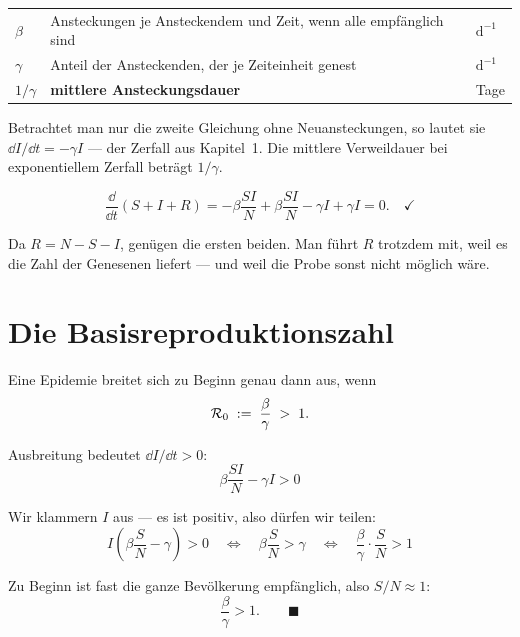 \begin{merksatz}
\begin{center}
\renewcommand{\arraystretch}{1.5}
\begin{tabular}{@{}P{1.4cm}P{3.0cm}P{3.6cm}@{}}
\toprule
$\beta$ & Ansteckungen je Ansteckendem und Zeit, wenn alle empfänglich sind & $\mathrm{d}^{-1}$\\
$\gamma$ & Anteil der Ansteckenden, der je Zeiteinheit genest & $\mathrm{d}^{-1}$\\
$1/\gamma$ & \textbf{mittlere Ansteckungsdauer} & Tage\\
\bottomrule
\end{tabular}
\end{center}

Betrachtet man nur die zweite Gleichung ohne Neuansteckungen, so lautet sie $\dd I/\dd t = -\gamma I$ --- der Zerfall aus Kapitel~1. Die mittlere Verweildauer bei exponentiellem Zerfall beträgt $1/\gamma$.

\[ \frac{\dd}{\dd t}(S+I+R) = -\beta\frac{SI}{N} + \beta\frac{SI}{N} - \gamma I + \gamma I = 0 . \quad \checkmark \]

\begin{center}
\begin{minipage}{0.88\textwidth}
\end{minipage}
\end{center}

Da $R = N - S - I$, genügen die ersten beiden. Man führt $R$ trotzdem mit, weil es die Zahl der Genesenen liefert --- und weil die Probe sonst nicht möglich wäre.
\end{merksatz}

\section{Die Basisreproduktionszahl}

\begin{merksatz}
Eine Epidemie breitet sich zu Beginn genau dann aus, wenn
\[ \mathcal{R}_0 \;:=\; \frac{\beta}{\gamma} \;>\; 1 . \]

Ausbreitung bedeutet $\dd I/\dd t > 0$:
\[ \beta\frac{SI}{N} - \gamma I > 0 \]

Wir klammern $I$ aus --- es ist positiv, also dürfen wir teilen:
\[ I\left(\beta\frac{S}{N} - \gamma\right) > 0 \quad\Longleftrightarrow\quad \beta\frac{S}{N} > \gamma \quad\Longleftrightarrow\quad \frac{\beta}{\gamma}\cdot\frac{S}{N} > 1 \]

Zu Beginn ist fast die ganze Bevölkerung empfänglich, also $S/N \approx 1$:
\[ \frac{\beta}{\gamma} > 1 . \qquad \blacksquare \]
\end{merksatz}

